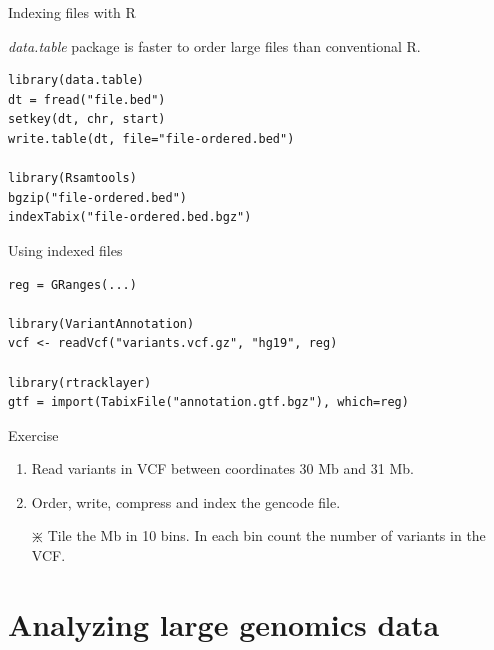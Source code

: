 \documentclass[10pt]{beamer}
\begin{document}
\begin{frame}[fragile]{Indexing files with R}
  \begin{block}{}
    {\it data.table} package is faster to order large files than conventional R.
  \end{block}
  \bigskip
  \begin{block}{}
  \begin{lstlisting}
library(data.table)
dt = fread("file.bed")
setkey(dt, chr, start)
write.table(dt, file="file-ordered.bed")

library(Rsamtools)
bgzip("file-ordered.bed")
indexTabix("file-ordered.bed.bgz")
  \end{lstlisting}
  \end{block}
\end{frame}

\begin{frame}[fragile]{Using indexed files}
  \begin{block}{}
  \begin{lstlisting}
reg = GRanges(...)

library(VariantAnnotation)
vcf <- readVcf("variants.vcf.gz", "hg19", reg)

library(rtracklayer)
gtf = import(TabixFile("annotation.gtf.bgz"), which=reg)
  \end{lstlisting}
  \end{block}
  \bigskip
  \begin{alertblock}{Exercise}
  \begin{enumerate}
  \item Read variants in VCF between coordinates 30 Mb and 31 Mb.
  \item Order, write, compress and index the gencode file.
  \item[$\divideontimes$] Tile the Mb in 10 bins. In each bin count the number of variants in the VCF.
  \end{enumerate}
  \end{alertblock}
\end{frame}

\section{Analyzing large genomics data}
\end{document}
